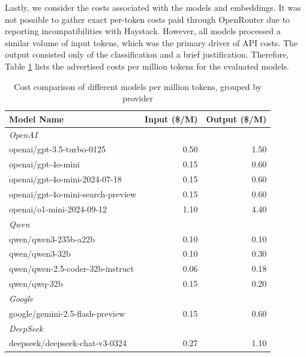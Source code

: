 Lastly, we consider the costs associated with the models and embeddings. It was not possible to gather exact per-token costs paid through OpenRouter due to reporting incompatibilities with Haystack. However, all models processed a similar volume of input tokens, which was the primary driver of API costs. The output consisted only of the classification and a brief justification. Therefore, Table \ref{tab:model_costs} lists the advertised costs per million tokens for the evaluated models.

\begin{table}[!ht]
    \centering
    \caption{Cost comparison of different models per million tokens, grouped by provider}
    \label{tab:model_costs}
    \begin{tabular}{lrr}
        \hline
        \textbf{Model Name} & \textbf{Input (\$/M)} & \textbf{Output (\$/M)} \\
        \hline
        \multicolumn{3}{l}{\textit{OpenAI}} \\
        openai/gpt-3.5-turbo-0125 & 0.50 & 1.50 \\
        openai/gpt-4o-mini & 0.15 & 0.60 \\
        openai/gpt-4o-mini-2024-07-18 & 0.15 & 0.60 \\
        openai/gpt-4o-mini-search-preview & 0.15 & 0.60 \\
        openai/o1-mini-2024-09-12 & 1.10 & 4.40 \\
        \hline
        \multicolumn{3}{l}{\textit{Qwen}} \\
        qwen/qwen3-235b-a22b & 0.10 & 0.10 \\
        qwen/qwen3-32b & 0.10 & 0.30 \\
        qwen/qwen-2.5-coder-32b-instruct & 0.06 & 0.18 \\
        qwen/qwq-32b & 0.15 & 0.20 \\
        \hline
        \multicolumn{3}{l}{\textit{Google}} \\
        google/gemini-2.5-flash-preview & 0.15 & 0.60 \\
        \hline
        \multicolumn{3}{l}{\textit{DeepSeek}} \\
        deepseek/deepseek-chat-v3-0324 & 0.27 & 1.10 \\
        \hline
    \end{tabular}
\end{table}

